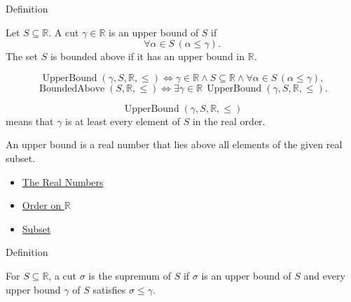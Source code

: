 \begin{definitionbox}{Definition}
\begin{definition}
\label{def:upper-bound-in-r}
Let $S\subseteq\mathbb{R}$. A cut $\gamma\in\mathbb{R}$ is an upper bound of $S$
if
\[
\forall\alpha\in S\,(\alpha\le\gamma).
\]
The set $S$ is bounded above if it has an upper bound in $\mathbb{R}$.
\end{definition}
\end{definitionbox}

\begin{remark*}
\[
\operatorname{UpperBound}(\gamma,S,\mathbb{R},\le)
\Longleftrightarrow
\gamma\in\mathbb{R}\land S\subseteq\mathbb{R}\land
\forall\alpha\in S\,(\alpha\le\gamma),
\]
\[
\operatorname{BoundedAbove}(S,\mathbb{R},\le)
\Longleftrightarrow
\exists\gamma\in\mathbb{R}\,\operatorname{UpperBound}(\gamma,S,\mathbb{R},\le).
\]
\end{remark*}

\begin{remark*}
\[
\operatorname{UpperBound}(\gamma,S,\mathbb{R},\le)
\]
means that $\gamma$ is at least every element of $S$ in the real order.
\end{remark*}

\begin{remark*}[Interpretation]
An upper bound is a real number that lies above all elements of the given real subset.
\end{remark*}

\begin{dependencies}
\begin{itemize}
  \item \hyperref[def:reals]{The Real Numbers}
  \item \hyperref[def:order-on-r]{Order on $\mathbb{R}$}
  \item \hyperref[def:subset]{Subset}
\end{itemize}
\end{dependencies}

\begin{definitionbox}{Definition}
\begin{definition}
\label{def:supremum-in-r}
For $S\subseteq\mathbb{R}$, a cut $\sigma$ is the supremum of $S$ if $\sigma$
is an upper bound of $S$ and every upper bound $\gamma$ of $S$ satisfies
$\sigma\le\gamma$.
\end{definition}
\end{definitionbox}

